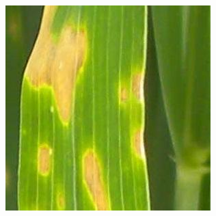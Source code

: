 \begin{figure}[H]
{\begin{minipage}[t]{.2\textwidth}
          \includegraphics[width=\textwidth]{resource/third/blight(3).jpg} 
        \end{minipage}
      }
\end{figure}
